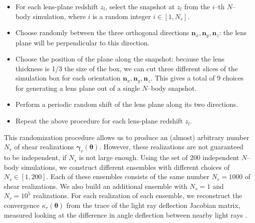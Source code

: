 \documentclass[reprint,aps,prd,superscriptaddress,showkeys,showpacs]{revtex4-1}
\newcommand{\bb}[1]{\mathbf{#1}}
\begin{document}
\begin{itemize}
\item For each lens-plane redshift $z_l$, select the snapshot at $z_l$ from the $i$--th $N$--body simulation, where $i$ is a random integer $i\in [1,N_s]$.
\item Choose randomly between the three orthogonal directions ${\bb{n}_x,\bb{n}_y,\bb{n}_z}$: the lens plane will be perpendicular to this direction.
\item Choose the position of the plane along the snapshot: because the lens thickness is 1/3 the size of the box, we can cut three different slices of the simulation box for each orientation ${\bb{n}_x,\bb{n}_y,\bb{n}_z}$. This gives a total of 9 choices for generating a lens plane out of a single $N$--body snapshot.
\item Perform a periodic random shift of the lens plane along its two directions.
\item Repeat the above procedure for each lens-plane redshift $z_l$.
\end{itemize}  
%
This randomization procedure allows us to produce an (almost)
arbitrary number $N_r$ of shear realizations
$\pmb{\gamma}_r(\pmb{\theta})$. However, these realizations are not
guaranteed to be independent, if $N_s$ is not large enough. Using the
set of 200 independent $N$--body simulations, we construct different
ensembles with different choices of $N_s\in[1,200]$. Each of these
ensembles consists of the same number $N_r=1000$ of shear
realizations. We also build an additional ensemble with $N_s=1$ and
$N_r=10^5$ realizations. For each realization of each ensemble, we
reconstruct the convergence $\kappa_r(\pmb{\theta})$ from the trace of the light ray deflection Jacobian matrix, measured looking at the difference in angle deflection between nearby light rays \citep{RayTracingHartlap,RayTracingJain,Sato12}.
\end{document}
